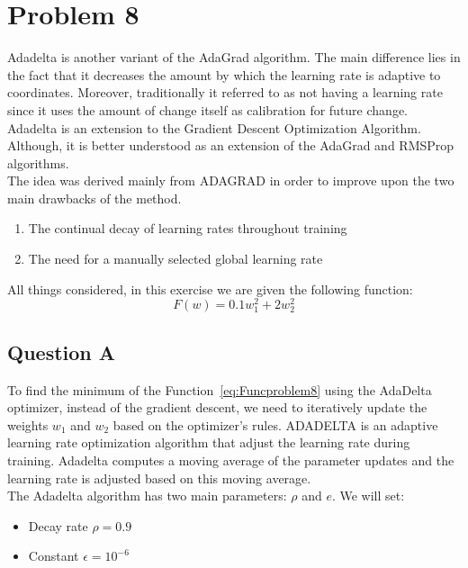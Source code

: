 \section{Problem 8}
Adadelta is another variant of the AdaGrad algorithm. The main difference lies in the fact that it decreases the amount by which the learning rate is adaptive to coordinates. Moreover, traditionally it referred to as not having a learning rate since it uses the amount of change itself as calibration for future change. Adadelta is an extension to the Gradient Descent Optimization Algorithm. Although, it is better understood as an extension of the AdaGrad and RMSProp algorithms. \\

The idea was derived mainly from ADAGRAD in order to improve upon the two main drawbacks of the method.
\begin{enumerate}
	\item The continual decay of learning rates throughout training
	\item The need for a manually selected
	global learning rate
\end{enumerate}

All things considered, in this exercise we are given the following function:
\begin{equation}
	F(w) = 0.1w_1^2 + 2w_2^2
\label{eq:Funcproblem8}
\end{equation}

\vspace{1mm}

\subsection{Question A}
To find the minimum of the Function~\ref{eq:Funcproblem8} using the AdaDelta optimizer, instead of the gradient descent, we need to iteratively update the weights $w_1$ and $w_2$ based on the optimizer's rules. ADADELTA is an adaptive learning rate optimization algorithm that adjust the learning rate during training. Adadelta computes a moving average of the parameter updates and the learning rate is adjusted based on this moving average.\\

The Adadelta algorithm has two main parameters: $\rho$ and $e$. We will set:
\begin{itemize}
	\item Decay rate $\rho = 0.9$
	\item Constant $\epsilon = 10^{-6}$ 
\end{itemize}

